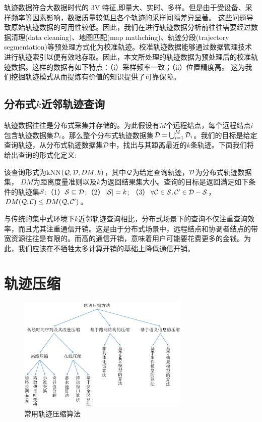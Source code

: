 轨迹数据符合大数据时代的 3V 特征,即量大、实时、多样。但是由于受设备、采样频率等因素影响，数据质量较低且各个轨迹的采样间隔差异显著。
这些问题导致原始轨迹数据的可用性较低。因此，我们在进行轨迹数据分析前往往需要经过数据清理(data cleaning)、地图匹配(map mathching)、轨迹分段(trajectory segmentation)等预处理方式化为校准轨迹。校准轨迹数据能够通过数据管理技术进行轨迹索引以便有效地存取。因此，本文所处理的轨迹数据为预处理后的校准轨迹数据。这样的数据有如下特点：（i）采样频率一致；（ii）位置精度高。
这为我们挖掘轨迹模式从而提炼有价值的知识提供了可靠保障。

\subsection{分布式$k$近邻轨迹查询}
轨迹数据往往是分布式采集并存储的。为此假设有$M$个远程结点，每个远程结点$i$包含轨迹数据集${\cal D}_{i}$。那么整个分布式轨迹数据集${\cal D}=\bigcup_{i=1}^{M} {\cal D}_{i}$。我们的目标是给定查询轨迹，从分布式轨迹数据集${\cal D}$中，找出与其距离最近的$k$条轨迹。下面我们将给出查询的形式化定义:
\begin{define}[分布式k近邻轨迹查询]
	该查询形式为kNN$({\cal Q}, {\cal D},DM,k)$，其中$\cal Q$为给定查询轨迹，${\cal D}$为分布式轨迹数据集， $DM$为距离度量准则以及$k$为返回结果集大小。查询的目标是返回满足如下条件的轨迹集$\cal S$:（1）${\cal S} \subseteq {\cal D}$;（2）$| {\cal S}|=k$;
	（3）$\forall {\cal C} \in {\cal S}, {\cal C}' \in {{\cal D} - \cal S}$，$DM({\cal Q},{\cal C}) \le DM({\cal Q},{\cal C}')$。
\end{define}

与传统的集中式环境下$k$近邻轨迹查询相比，分布式场景下的查询不仅注重查询效率，而且尤其注重通信开销。这是由于分布式场景中，远程结点和协调者结点的带宽资源往往是有限的。而高的通信开销，意味着用户可能要花费更多的金钱。为此，我们应该在不牺牲太多计算开销的基础上降低通信开销。

\section{轨迹压缩}\label{sec-c2-reduction}
\begin{figure}[t]
	\centering
	\includegraphics[width=0.73\textwidth]{Fig/chapter2/Compress}
	\caption{常用轨迹压缩算法}
	\label{fig-chapter2-compress}
\end{figure}

